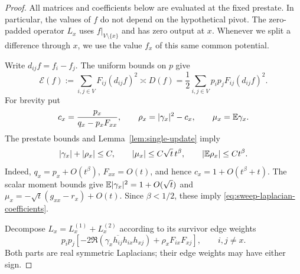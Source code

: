 \begin{proof}
All matrices and coefficients below are evaluated at the fixed prestate.
In particular, the values of \(f\) do not depend on the hypothetical
pivot.  The zero-padded operator \(L_x\) uses \(f|_{V\setminus\{x\}}\)
and has zero output at \(x\).  Whenever we split a difference through
\(x\), we use the value \(f_x\) of this same common potential.

Write \(d_{ij}f=f_i-f_j\).  The uniform bounds on \(p\) give
\begin{equation}\label{eq:sweep-laplacian-unweighted-energy}
 \mathcal E(f):=\sum_{i,j\in V}F_{ij}(d_{ij}f)^2
 \asymp D(f)
 =\frac12\sum_{i,j\in V}p_ip_jF_{ij}(d_{ij}f)^2.
\end{equation}
For brevity put
\[
 c_x=\frac{p_x}{q_x-p_xF_{xx}},\qquad
 \rho_x=|\gamma_x|^2-c_x,\qquad
 \mu_x=\mathbb E\gamma_x .
\]
The prestate bounds and Lemma~\ref{lem:single-update} imply
\begin{equation}\label{eq:sweep-laplacian-coefficients}
 |\gamma_x|+|\rho_x|\le C,\qquad
 |\mu_x|\le C\sqrt t\,t^\beta,\qquad
 |\mathbb E\rho_x|\le Ct^\beta .
\end{equation}
Indeed, \(q_x=p_x+O(t^\beta)\), \(F_{xx}=O(t)\), and hence
\(c_x=1+O(t^\beta+t)\).  The scalar moment bounds give
\(\mathbb E|\gamma_x|^2=1+O(\sqrt t)\) and
\(\mu_x=-\sqrt t(g_{xx}-r_x)+O(t)\).  Since \(\beta<1/2\),
these imply \eqref{eq:sweep-laplacian-coefficients}.

Decompose \(L_x=L_x^{(1)}+L_x^{(2)}\) according to its survivor
edge weights
\begin{equation}\label{eq:sweep-laplacian-edge-split}
 p_ip_j\left[
 -2\Re\!\left(\gamma_x\overline{h_{ij}}h_{ix}h_{xj}\right)
 +\rho_xF_{ix}F_{xj}\right],\qquad i,j\ne x.
\end{equation}
Both parts are real symmetric Laplacians; their edge weights may have
either sign.


\end{proof}
